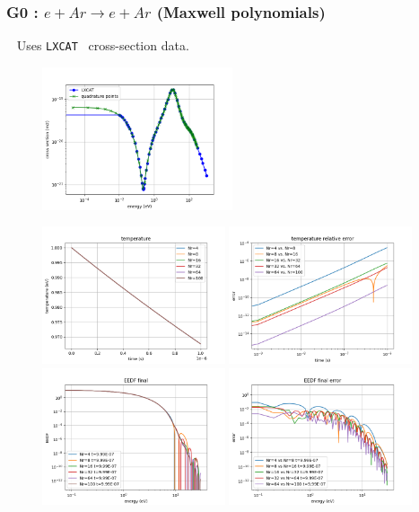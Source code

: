 \documentclass[mathserif, aspectratio=169]{beamer}
\newcommand{\lxcat}{\texttt{LXCAT}}
\begin{document}
	\begin{frame}
		\frametitle{G0 : $e + Ar \rightarrow e + Ar$ (Maxwell polynomials)}
		\textbullet~ Uses \lxcat~ cross-section data.
		\begin{figure}
			\only<+>
			{	
				\centering
				\includegraphics[width=0.5\textwidth]{g0_tcs.png}
			}

			\only<+>
			{
				\includegraphics[width=0.48\textwidth]{g0_mw_temp.png}
				\includegraphics[width=0.48\textwidth]{g0_mw_temp_error.png}
			}
			\only<+>
			{
				\includegraphics[width=0.48\textwidth]{g0_mw_eedf_final.png}
				\includegraphics[width=0.48\textwidth]{g0_mw_eedf_final_error.png}
			}
		\end{figure}
	\end{frame}
\end{document}

